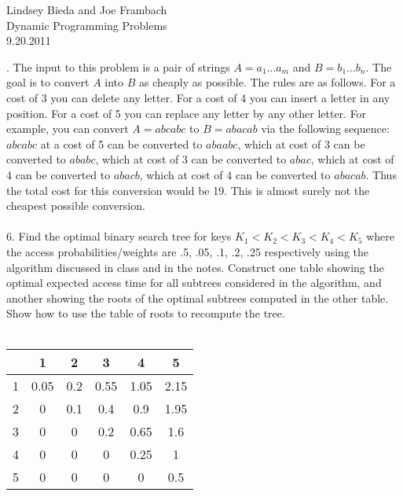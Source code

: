 \documentclass[10pt]{article}
\begin{document}
	\begin{flushright}
	Lindsey Bieda and Joe Frambach\\
	Dynamic Programming Problems\\
	9.20.2011
	\end{flushright}
	. The input to this problem is a pair of strings $A = a_1 . . . a_m$ and $B = b_1 . . . b_n$. The goal is to convert
	$A$ into $B$ as cheaply as possible. The rules are as follows. For a cost of 3 you can delete any letter.
	For a cost of 4 you can insert a letter in any position. For a cost of 5 you can replace any letter by
	any other letter. For example, you can convert $A = abcabc$ to $B = abacab$ via the following sequence:
	$abcabc$ at a cost of 5 can be converted to $abaabc$, which at cost of 3 can be converted to $ababc$, which
	at cost of 3 can be converted to $abac$, which at cost of 4 can be converted to $abacb$, which at cost of 4
	can be converted to $abacab$. Thus the total cost for this conversion would be 19. This is almost surely
	not the cheapest possible conversion.\\
	\\
	6. Find the optimal binary search tree for keys $K_1 < K_2 < K_3 < K_4 < K_5$ where the access probabilities/weights 
	are .5, .05, .1, .2, .25 respectively using the algorithm discussed in class and in the notes.
	Construct one table showing the optimal expected access time for all subtrees considered in the algorithm, 
	and another showing the roots of the optimal subtrees computed in the other table. Show how
	to use the table of roots to recompute the tree.\\
	\\
	\begin{tabular}{|c|c|c|c|c|c|}
		\hline
		& 1 & 2  & 3 & 4 & 5\\ \hline
		1 & 0.05 &	0.2 & 0.55 & 1.05 & 2.15\\ \hline
		2 & 0 & 0.1 & 0.4 & 0.9 & 1.95 \\ \hline
		3 & 0 & 0 & 0.2 & 0.65 & 1.6\\ \hline
		4 & 0 & 0 & 0 & 0.25 & 1\\ \hline
		5 & 0 & 0 & 0 & 0 & 0.5\\ \hline	
	\end{tabular}
\end{document}
